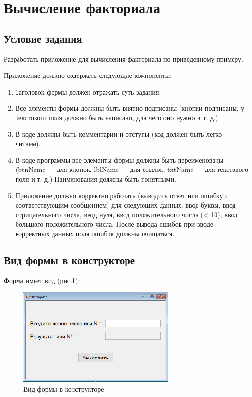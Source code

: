 \section{Вычисление факториала}

\subsection{Условие задания}


Разработать приложение для вычисления факториала по приведенному примеру.

Приложение должно содержать следующие компоненты:

\begin{enumerate}
    \item{Заголовок формы должен отражать суть задания.}
    \item{Все элементы формы должны быть внятно подписаны (кнопки подписаны, у текстового поля должно быть написано, для чего оно нужно и т. д.)}
    \item{В коде должны быть комментарии и отступы (код должен быть легко читаем).}
    \item{В коде программы все элементы формы должны быть переименованы (btnName --- для кнопок, lblName --- для ссылок, txtName --- для текстового поля и т. д.) Наименования должны быть понятными.}
    \item{Приложение должно корректно работать (выводить ответ или ошибку с соответствующим сообщением) для следующих данных: ввод буквы, ввод отрицательного числа, ввод нуля, ввод положительного числа (< 10), ввод большого положительного числа. После вывода ошибок при вводе корректных данных поля ошибок должны очищаться.}
\end{enumerate}

\subsection{Вид формы в конструкторе}

Форма имеет вид (рис.\ref{fig:FormInConstruct1}):

\begin{figure}[!h]
    \centering
    \includegraphics[width = 0.7\textwidth]{images/Task1/FormInConstructor.png}
    \caption{Вид формы в конструкторе}
    \label{fig:FormInConstruct1}
\end{figure}


